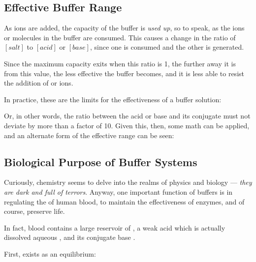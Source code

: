 

		\subsection{Effective Buffer Range}

			As  ions are added, the capacity of the buffer is \textit{used up}, so to speak, as the ions or molecules in the buffer are
			consumed. This causes a change in the ratio of $[salt]$ to $[acid]$ or $[base]$, since one is consumed and the other is generated.

			Since the maximum capacity exits when this ratio is 1, the further away it is from this value, the less effective the buffer becomes,
			and it is less able to resist the addition of  or  ions.

			In practice, these are the limits for the effectiveness of a buffer solution:


			Or, in other words, the ratio between the acid or base and its conjugate must not deviate by more than a factor of \num{10}. Given
			this, then, some math can be applied, and an alternate form of the effective range can be seen:




		\pagebreak
		\subsection{Biological Purpose of Buffer Systems}

			Curiously, chemistry seems to delve into the realms of physics and biology --- \textit{they are dark and full of terrors}. Anyway,
			one important function of buffers is in regulating the \pH{} of human blood, to maintain the effectiveness of enzymes, and of course,
			preserve life.

			In fact, blood contains a large reservoir of , a weak acid which is actually dissolved aqueous , and its
			conjugate base .

			First,  exists as an equilibrium:


